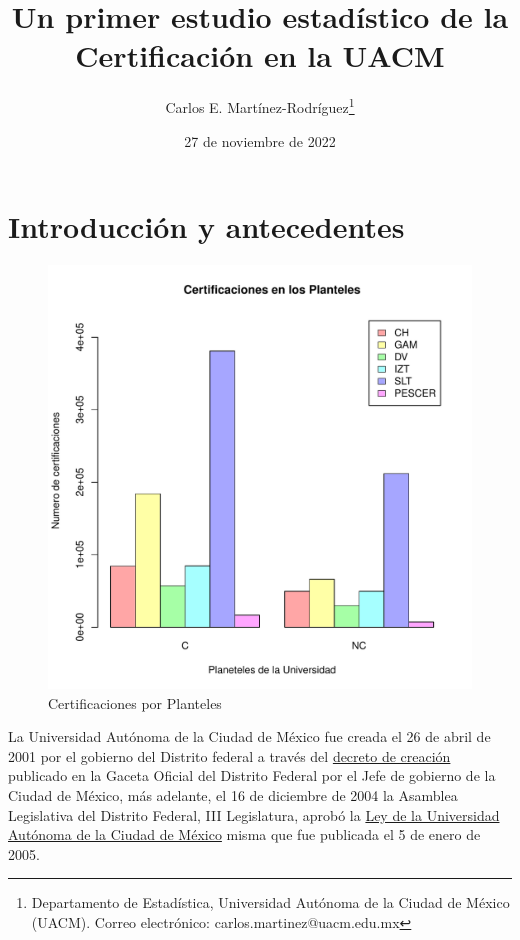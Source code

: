 \documentclass[12pt]{article}
\title{Un primer estudio estad\'istico de la Certificaci\'on en la UACM}
\author{Carlos E. Martínez-Rodríguez\thanks{Departamento de Estadística, Universidad Autónoma de la Ciudad de México (UACM). Correo electrónico: carlos.martinez@uacm.edu.mx}}
\date{27 de noviembre de 2022}
\begin{document}
\maketitle

\section{Introducci\'on y antecedentes}



\begin{figure}
\centering
\includegraphics[scale=0.45]{Graficas/BarPlotPlantelCal.pdf}
\caption{Certificaciones por Planteles}
\label{Fig.Cert.Plantel-Cal}
\end{figure}

La Universidad Aut\'onoma de la Ciudad de M\'exico fue creada el 26 de abril de 2001 por el gobierno del Distrito federal a trav\'es del \href{https://www.uacm.edu.mx/Portals/0/adam/Content/hfXbhKHHXE2k2Y8j2fG9UQ/Text/DCUACM.pdf}{decreto de creaci\'on} publicado en la Gaceta Oficial del Distrito Federal por el Jefe de gobierno de la Ciudad de M\'exico, m\'as adelante, el 16 de diciembre de 2004 la Asamblea Legislativa del Distrito Federal, III Legislatura, aprob\'o la \href{https://www.uacm.edu.mx/Portals/0/ley_uacm092011.pdf}{Ley de la Universidad Aut\'onoma de la Ciudad de M\'exico} misma que fue publicada el 5 de enero de 2005.
\end{document}

